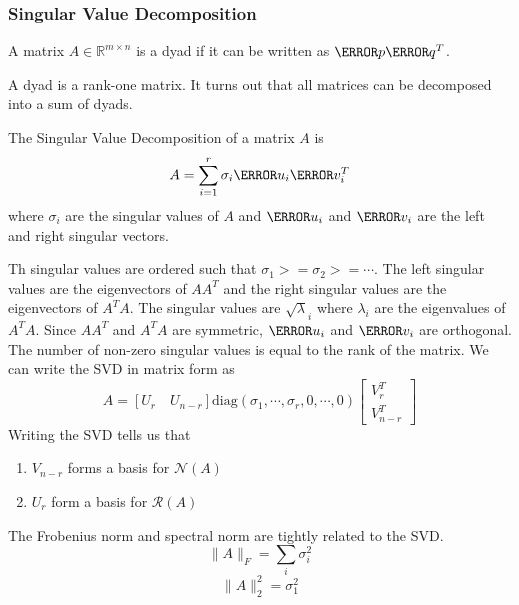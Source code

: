 \subsubsection{Singular Value Decomposition}
\begin{definition}
	A matrix $A\in\mathbb{R}^{m\times n}$ is a dyad if it can be written as $\V{p}\V{q}^T$.
	\label{defn:dyad}
\end{definition}
A dyad is a rank-one matrix.
It turns out that all matrices can be decomposed into a sum of dyads.
\begin{definition}
	The Singular Value Decomposition of a matrix $A$ is \[
		A = \sum_{i=1}^{r} \sigma_i \V{u}_i\V{v}_i^T
	\]
	where $\sigma_i$ are the singular values of $A$ and $\V{u}_i$ and $\V{v}_i$ are the left and right singular vectors.
	\label{defn:svd}
\end{definition}
Th singular values are ordered such that $\sigma_1 >= \sigma_2 >= \cdots$.
The left singular values are the eigenvectors of $AA^T$ and the right singular values are the eigenvectors of $A^TA$.
The singular values are $\sqrt{\lambda}_i$ where $\lambda_i$ are the eigenvalues of $A^TA$.
Since $AA^T$ and $A^TA$ are symmetric, $\V{u}_i$ and $\V{v}_i$ are orthogonal.
The number of non-zero singular values is equal to the rank of the matrix.
We can write the SVD in matrix form as \[
	A = \left[U_r\quad U_{n-r}\right]\text{diag}(\sigma_1,\cdots,\sigma_r,0,\cdots,0)\begin{bmatrix}V^T_r\\V^T_{n-r}\end{bmatrix}
\]
Writing the SVD tells us that 
\begin{enumerate}
	\item $V_{n-r}$ forms a basis for $\mathcal{N}(A)$
	\item $U_{r}$ form a basis for $\mathcal{R}(A)$
\end{enumerate}
The Frobenius norm and spectral norm are tightly related to the SVD.
\[
	\|A\|_F = \sum_{i}\sigma_i^2
\]
\[
	\|A\|_2^2 = \sigma_1^2
\]

